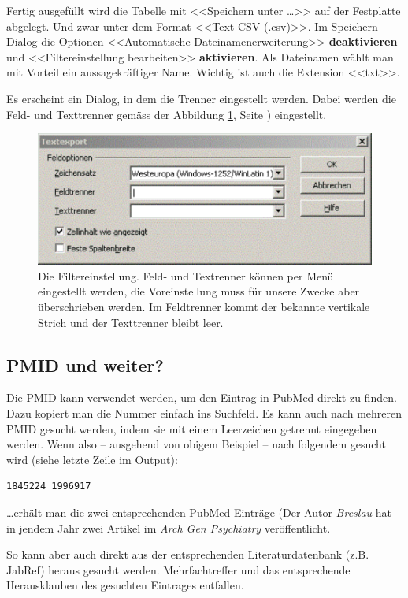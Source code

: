 \documentclass[div=15,parskip=half]{scrartcl}
\begin{document}
Fertig ausgefüllt wird die Tabelle mit <<Speichern unter \dots >> auf der Festplatte abgelegt. Und zwar unter dem Format <<Text CSV (.csv)>>. Im Speichern-Dialog die Optionen <<Automatische Dateinamenerweiterung>> \textbf{deaktivieren} und <<Filtereinstellung bearbeiten>> \textbf{aktivieren}. Als Dateinamen wählt man mit Vorteil ein aussagekräftiger Name. Wichtig ist auch die Extension <<txt>>.

Es erscheint ein Dialog, in dem die Trenner eingestellt werden. Dabei werden die Feld- und Texttrenner gemäss der Abbildung \ref{fig:Filtereinstellung}, Seite \pageref{fig:Filtereinstellung}) eingestellt.

\begin{figure}
\label{fig:Filtereinstellung}
\center
\includegraphics[scale=.7]{fig-filtereinstellung.pdf} 
\caption{Die Filtereinstellung. Feld- und Textrenner können per Menü eingestellt werden, die Voreinstellung muss für unsere Zwecke aber überschrieben werden. Im Feldtrenner kommt der bekannte vertikale Strich und der Texttrenner bleibt leer.}

\end{figure}

\subsection*{PMID und weiter?}

Die PMID kann verwendet werden, um den Eintrag in PubMed direkt zu finden. Dazu kopiert man die Nummer einfach ins Suchfeld. Es kann auch nach mehreren PMID gesucht werden, indem sie mit einem Leerzeichen getrennt eingegeben werden. Wenn also -- ausgehend von obigem Beispiel -- nach folgendem gesucht wird (siehe letzte Zeile im Output):
\begin{verbatim}1845224 1996917 \end{verbatim}
\dots erhält man die zwei entsprechenden PubMed-Einträge (Der Autor \textsl{Breslau} hat in jendem Jahr zwei Artikel im \textsl{Arch Gen Psychiatry} veröffentlicht. 

So kann aber auch direkt aus der entsprechenden Literaturdatenbank (z.B. JabRef) heraus gesucht werden. Mehrfachtreffer und das entsprechende Herausklauben des gesuchten Eintrages entfallen.
\end{document}
